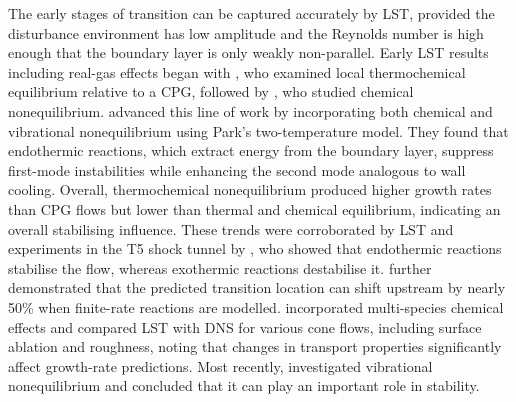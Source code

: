 The early stages of transition can be captured accurately by \gls{LST}, provided the disturbance environment has low amplitude and the Reynolds number is high enough that the boundary layer is only weakly non-parallel. Early \gls{LST} results including real-gas effects began with \cite{Malik1989, Malik1990a}, who examined local thermochemical equilibrium relative to a \gls{CPG}, followed by \cite{stuckertreed1994}, who studied chemical nonequilibrium. \cite{Hudson1997} advanced this line of work by incorporating both chemical and vibrational nonequilibrium using Park’s two-temperature model. They found that endothermic reactions, which extract energy from the boundary layer, suppress first-mode instabilities while enhancing the second mode analogous to wall cooling. Overall, thermochemical nonequilibrium produced higher growth rates than \gls{CPG} flows but lower than thermal and chemical equilibrium, indicating an overall stabilising influence. These trends were corroborated by \gls{LST} and experiments in the T5 shock tunnel by \cite{JohnsonEtal1998}, who showed that endothermic reactions stabilise the flow, whereas exothermic reactions destabilise it. \cite{JohnsonCandler2005} further demonstrated that the predicted transition location can shift upstream by nearly 50\% when finite-rate reactions are modelled. \cite{MortensenZhong2013} incorporated multi-species chemical effects and compared \gls{LST} with \gls{DNS} for various cone flows, including surface ablation and roughness, noting that changes in transport properties significantly affect growth-rate predictions. Most recently, \cite{BitterShepherd2015} investigated vibrational nonequilibrium and concluded that it can play an important role in stability. 


